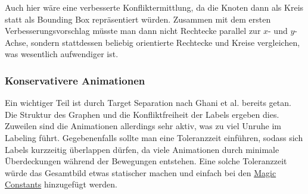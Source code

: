 Auch hier wäre eine verbesserte Konfliktermittlung, da die Knoten dann als Kreis statt als Bounding Box repräsentiert würden.
Zusammen mit dem ersten Verbesserungsvorschlag müsste man dann nicht Rechtecke parallel zur $x$- und $y$-Achse, sondern stattdessen beliebig orientierte Rechtecke und Kreise vergleichen, was wesentlich aufwendiger ist.

\subsubsection{Konservativere Animationen}
Ein wichtiger Teil ist durch Target Separation nach Ghani et al. \cite{percept_animate} bereits getan. Die Struktur des Graphen und die Konfliktfreiheit der Labels ergeben dies.
Zuweilen sind die Animationen allerdings sehr aktiv, was zu viel Unruhe im Labeling führt. Gegebenenfalls sollte man eine Toleranzzeit einführen,
sodass sich Labels kurzzeitig überlappen dürfen, da viele Animationen durch minimale Überdeckungen während der Bewegungen entstehen.
Eine solche Toleranzzeit würde das Gesamtbild etwas statischer machen und einfach bei den \hyperref[subsec:consts]{Magic Constants} hinzugefügt werden.


